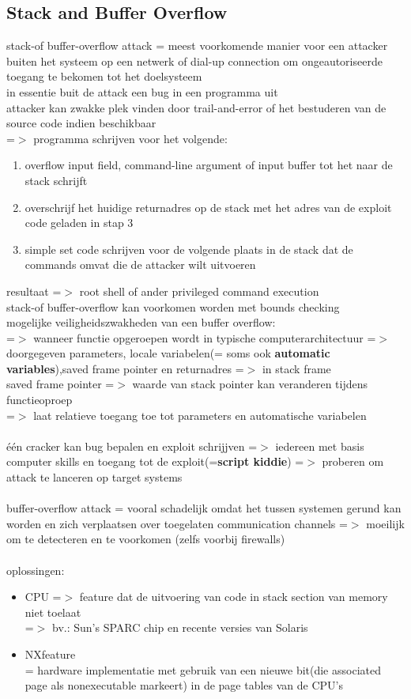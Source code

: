 \documentclass{report}
\begin{document}
\subsection{Stack and Buffer Overflow}
stack-of buffer-overflow attack = meest voorkomende manier voor een attacker buiten het systeem op een netwerk of dial-up connection om ongeautoriseerde toegang te bekomen tot het doelsysteem
\\in essentie buit de attack een bug in een programma uit
\\attacker kan zwakke plek vinden door trail-and-error of het bestuderen van de source code indien beschikbaar
\\ =$>$ programma schrijven voor het volgende:
\begin{enumerate}
\item overflow input field, command-line argument of input buffer tot het naar de stack schrijft
\item overschrijf het huidige returnadres op de stack met het adres van de exploit code geladen in stap 3
\item simple set code schrijven voor de volgende plaats in de stack dat de commands omvat die de attacker wilt uitvoeren
\end{enumerate}
resultaat =$>$ root shell of ander privileged command execution
\\stack-of buffer-overflow kan voorkomen worden met bounds checking
\\mogelijke veiligheidszwakheden van een buffer overflow:
\\=$>$ wanneer functie opgeroepen wordt in typische computerarchitectuur =$>$ doorgegeven parameters, locale variabelen(= soms ook \textbf{automatic variables}),saved frame pointer en returnadres =$>$ in stack frame
\\saved frame pointer =$>$ waarde van stack pointer kan veranderen tijdens functieoproep 
\\=$>$ laat relatieve toegang toe tot parameters en automatische variabelen
\\
\\\'e\'en cracker kan bug bepalen en exploit schrijjven =$>$ iedereen met basis computer skills en toegang tot de exploit(=\textbf{script kiddie}) =$>$ proberen om attack te lanceren op target systems
\\
\\buffer-overflow attack = vooral schadelijk omdat het tussen systemen gerund kan worden en zich verplaatsen over toegelaten communication channels =$>$ moeilijk om te detecteren en te voorkomen (zelfs voorbij firewalls)
\\
\\oplossingen: 
\begin{itemize}
\item CPU =$>$ feature dat de uitvoering van code in stack section van memory niet toelaat 
\\ =$>$ bv.: Sun's SPARC chip en recente versies van Solaris
\item NXfeature
\\= hardware implementatie met gebruik van een nieuwe bit(die associated page als nonexecutable markeert) in de page tables van de CPU's
\end{itemize}
\end{document}

